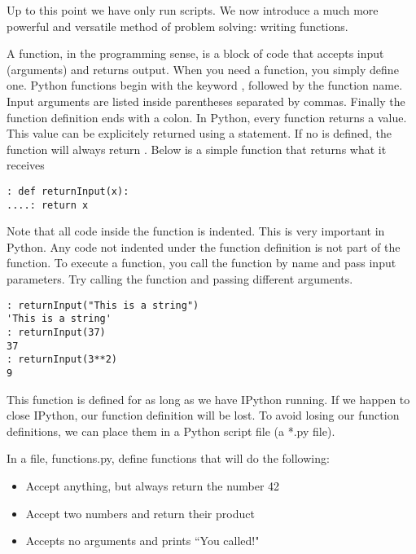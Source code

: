 

Up to this point we have only run scripts. We now introduce a much more powerful and versatile method of problem solving: writing functions.

A function, in the programming sense, is a block of code that accepts input (arguments) and returns output.  When you need a function, you simply define one.  Python functions begin with the keyword , followed by the function name.  Input arguments are listed inside parentheses separated by commas.  Finally the function definition ends with a colon.  In Python, every function returns a value. This value can be explicitely returned using a  statement.  If no  is defined, the function will always return .  Below is a simple function that returns what it receives
\begin{lstlisting}[style=python]
: def returnInput(x):
....: return x
\end{lstlisting}

Note that all code inside the function is indented.  This is very important in Python.  Any code not indented under the function definition is not part of the function.  To execute a function, you call the function by name and pass input parameters.  Try calling the function and passing different arguments.
\begin{lstlisting}[style=python]
: returnInput("This is a string")
'This is a string'
: returnInput(37)
37
: returnInput(3**2)
9
\end{lstlisting}

This function is defined for as long as we have IPython running.  If we happen to close IPython, our function definition will be lost.  To avoid losing our function definitions, we can place them in a Python script file (a *.py file).

\begin{problem}
In a file, functions.py, define functions that will do the following:
\begin{itemize}
\item Accept anything, but always return the number 42
\item Accept two numbers and return their product
\item Accepts no arguments and prints ``You called!"
\end{itemize}
\end{problem}

